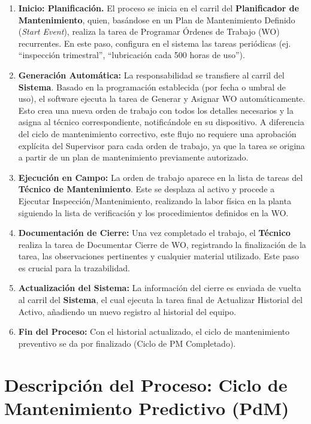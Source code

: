 \documentclass[12pt, a4paper]{article}
\begin{document}
\begin{enumerate}
    \item \textbf{Inicio: Planificación.} El proceso se inicia en el carril del \textbf{Planificador de Mantenimiento}, quien, basándose en un Plan de Mantenimiento Definido (\textit{Start Event}), realiza la tarea de Programar Órdenes de Trabajo (WO) recurrentes. En este paso, configura en el sistema las tareas periódicas (ej. ``inspección trimestral'', ``lubricación cada 500 horas de uso'').
    \item \textbf{Generación Automática:} La responsabilidad se transfiere al carril del \textbf{Sistema}. Basado en la programación establecida (por fecha o umbral de uso), el software ejecuta la tarea de Generar y Asignar WO automáticamente. Esto crea una nueva orden de trabajo con todos los detalles necesarios y la asigna al técnico correspondiente, notificándole en su dispositivo. A diferencia del ciclo de mantenimiento correctivo, este flujo no requiere una aprobación explícita del Supervisor para cada orden de trabajo, ya que la tarea se origina a partir de un plan de mantenimiento previamente autorizado.
    \item \textbf{Ejecución en Campo:} La orden de trabajo aparece en la lista de tareas del \textbf{Técnico de Mantenimiento}. Este se desplaza al activo y procede a Ejecutar Inspección/Mantenimiento, realizando la labor física en la planta siguiendo la lista de verificación y los procedimientos definidos en la WO.
    \item \textbf{Documentación de Cierre:} Una vez completado el trabajo, el \textbf{Técnico} realiza la tarea de Documentar Cierre de WO, registrando la finalización de la tarea, las observaciones pertinentes y cualquier material utilizado. Este paso es crucial para la trazabilidad.
    \item \textbf{Actualización del Sistema:} La información del cierre es enviada de vuelta al carril del \textbf{Sistema}, el cual ejecuta la tarea final de Actualizar Historial del Activo, añadiendo un nuevo registro al historial del equipo.
    \item \textbf{Fin del Proceso:} Con el historial actualizado, el ciclo de mantenimiento preventivo se da por finalizado (Ciclo de PM Completado).
\end{enumerate}

\section{Descripción del Proceso: Ciclo de Mantenimiento Predictivo (PdM)}
\end{document}

